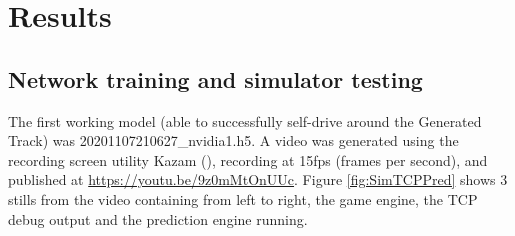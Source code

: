 
\chapter{Results}
\label{Results} 

  
  
  




\section{Network training and simulator testing}
\label{results:net-training} 
The first working model (able to successfully self-drive around the Generated Track) was   20201107210627\_nvidia1.h5. A video was generated using the recording screen utility Kazam (\cite{Kazam2020}), recording at 15fps (frames per second), and published at  \href{https://youtu.be/9z0mMtOnUUc}{https://youtu.be/9z0mMtOnUUc}. Figure \ref{fig:SimTCPPred}
shows 3 stills from the video containing from left to right, the game engine, the TCP debug output and the prediction engine running.

